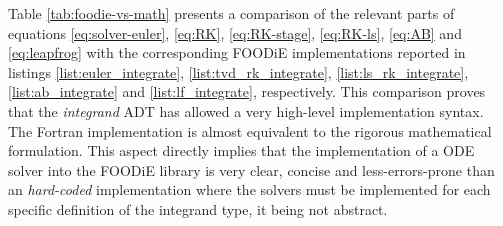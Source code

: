 \documentclass[pdftex,preprint,3p,times,numbers]{elsarticle}
\begin{document}
Table \ref{tab:foodie-vs-math} presents a comparison of the relevant parts of equations \ref{eq:solver-euler}, \ref{eq:RK}, \ref{eq:RK-stage}, \ref{eq:RK-ls}, \ref{eq:AB} and \ref{eq:leapfrog} with the corresponding FOODiE implementations reported in listings \ref{list:euler_integrate}, \ref{list:tvd_rk_integrate}, \ref{list:ls_rk_integrate}, \ref{list:ab_integrate} and \ref{list:lf_integrate}, respectively. This comparison proves that the \emph{integrand} ADT has allowed a very high-level implementation syntax. The Fortran implementation is almost equivalent to the rigorous mathematical formulation. This aspect directly implies that the implementation of a ODE solver into the FOODiE library is very clear, concise and less-errors-prone than an \emph{hard-coded} implementation where the solvers must be implemented for each specific definition of the integrand type, it being not abstract.
\end{document}
